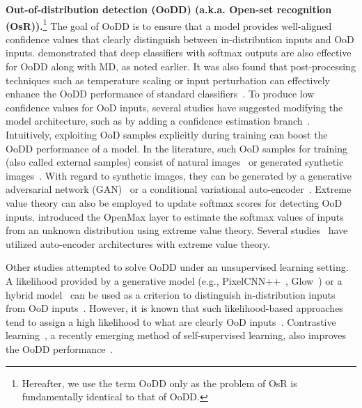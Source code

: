 \documentclass[preprint,12pt]{elsarticle}
\begin{document}
\textbf{Out-of-distribution detection (OoDD) (a.k.a. Open-set recognition (OsR)).}\footnote{Hereafter, we use the term OoDD only as the problem of OsR is fundamentally identical to that of OoDD.} 
The goal of OoDD is to ensure that a model provides well-aligned confidence values that clearly distinguish between in-distribution inputs and OoD inputs. \cite{hendrycks2016baseline} demonstrated that deep classifiers with softmax outputs are also effective for OoDD along with MD, as noted earlier. It was also found that post-processing techniques such as temperature scaling or input perturbation can effectively enhance the OoDD performance of standard classifiers~\citep{liang2017enhancing, lee2018simple}. To produce low confidence values for OoD inputs, several studies have suggested modifying the model architecture, such as by adding a confidence estimation branch~\citep{devries2018learning}. Intuitively, exploiting OoD samples explicitly during training can boost the OoDD performance of a model. In the literature, such OoD samples for training (also called external samples) consist of natural images~\citep{hendrycks2018deep} or generated synthetic images~\citep{lee2017training, vernekar2019genood}. With regard to synthetic images, they can be generated by a generative adversarial network (GAN)~\citep{lee2017training, neal2018openset, ge2017gopenmax} or a conditional variational auto-encoder~\citep{vernekar2019genood}. Extreme value theory can also be employed to update softmax scores for detecting OoD inputs. \cite{bendale2016towards} introduced the OpenMax layer to estimate the softmax values of inputs from an unknown distribution using extreme value theory. Several studies~\citep{oza2019c2ae, oza2019cnnosr} have utilized auto-encoder architectures with extreme value theory.

Other studies attempted to solve OoDD under an unsupervised learning setting. A likelihood provided by a generative model (e.g., PixelCNN++~\citep{salimans2017pixelcnn}, Glow~\citep{kingma2018glow}) or a hybrid model~\citep{nalisnick2019hybrid} can be used as a criterion to distinguish in-distribution inputs from OoD inputs~\citep{ren2019likelihood}. However, it is known that such likelihood-based approaches tend to assign a high likelihood to what are clearly OoD inputs~\citep{choi2019waic,nalisnick2018know}. Contrastive learning~\citep{chen2020simple}, a recently emerging method of self-supervised learning, also improves the OoDD performance~\citep{winkens2020contrastive}.
\end{document}
